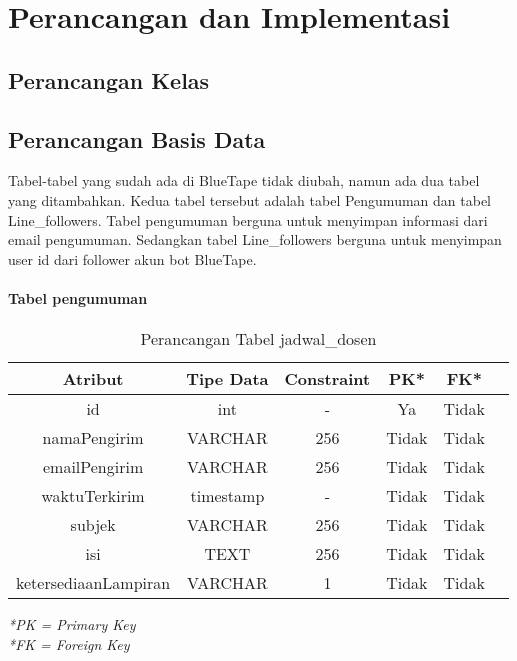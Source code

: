 \chapter{Perancangan dan Implementasi}
\label{chap:perancanganDanImplementasi}

\section{Perancangan Kelas}


\section{Perancangan Basis Data}
Tabel-tabel yang sudah ada di BlueTape tidak diubah, namun ada dua tabel yang ditambahkan. Kedua tabel tersebut adalah tabel Pengumuman dan tabel Line\_followers. Tabel pengumuman berguna untuk menyimpan informasi dari email pengumuman. Sedangkan tabel Line\_followers berguna untuk menyimpan user id dari follower akun bot BlueTape.

\subsubsection{Tabel pengumuman}
\begin{center}
	\begin{table}[H]
	\caption{Perancangan Tabel jadwal\_dosen}
	\begin{tabular}{|c|c|c|c|c|c|}
 			\hline
			\textbf{Atribut} & \textbf{Tipe Data} & \textbf{Constraint} & \textbf{PK*}  & \textbf{FK*} \\
			\hline
		 	 id & int & - & Ya & Tidak\\
			\hline
			 namaPengirim & VARCHAR & 256 & Tidak & Tidak\\
            \hline
			 emailPengirim & VARCHAR & 256 & Tidak & Tidak\\
            \hline
			 waktuTerkirim & timestamp & - & Tidak & Tidak\\
            \hline
			 subjek & VARCHAR & 256 & Tidak & Tidak\\
            \hline
			 isi & TEXT & 256 & Tidak & Tidak\\
            \hline
			 ketersediaanLampiran & VARCHAR & 1 & Tidak & Tidak\\
			\hline
	\end{tabular}
	\end{table}
\end{center}
\textit{*PK = Primary Key} \\
\textit{*FK = Foreign Key} \\

